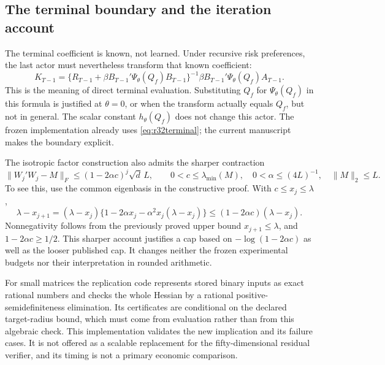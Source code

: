 \subsection{The terminal boundary and the iteration account}
The terminal coefficient is known, not learned. Under recursive risk
preferences, the last actor must nevertheless transform that known coefficient:
\begin{equation}\label{eq:r32terminal}
 K_{T-1}=\{R_{T-1}+\beta B_{T-1}'\Psi_\theta(Q_f)B_{T-1}\}^{-1}
              \beta B_{T-1}'\Psi_\theta(Q_f)A_{T-1}.
\end{equation}
This is the meaning of direct terminal evaluation. Substituting $Q_f$ for
$\Psi_\theta(Q_f)$ in this formula is justified at $\theta=0$, or when the
transform actually equals $Q_f$, but not in general. The scalar constant
$h_\theta(Q_f)$ does not change this actor. The frozen implementation already
uses \eqref{eq:r32terminal}; the current manuscript makes the boundary explicit.

The isotropic factor construction also admits the sharper contraction
\[
 \|W_j'W_j-M\|_F\leq(1-2\alpha c)^j\sqrt d\,L,
 \qquad 0<c\leq\lambda_{\min}(M),\quad
 0<\alpha\leq(4L)^{-1},\quad\|M\|_2\leq L.
\]
To see this, use the common eigenbasis in the constructive proof. With
$c\leq x_j\leq\lambda$,
\[
 \lambda-x_{j+1}=(\lambda-x_j)
   \{1-2\alpha x_j-\alpha^2x_j(\lambda-x_j)\}
 \leq(1-2\alpha c)(\lambda-x_j).
\]
Nonnegativity follows from the previously proved upper bound
$x_{j+1}\leq\lambda$, and $1-2\alpha c\geq1/2$. This sharper account
justifies a cap based on $-\log(1-2\alpha c)$ as well as the looser published
cap. It changes neither the frozen experimental budgets nor their interpretation
in rounded arithmetic.

For small matrices the replication code represents stored binary inputs as
exact rational numbers and checks the whole Hessian by a rational
positive-semidefiniteness elimination. Its certificates are conditional on the
declared target-radius bound, which must come from evaluation rather than from
this algebraic check. This implementation validates the new implication and
its failure cases. It is not offered as a scalable replacement for the
fifty-dimensional residual verifier, and its timing is not a primary economic
comparison.
